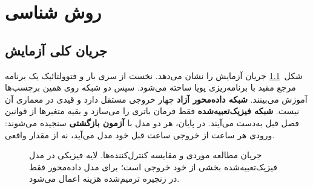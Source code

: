 \chapter{روش شناسی}
\label{chap:method}

\section{جریان کلی آزمایش}
شکل~\ref{fig:experiment-flow} جریان آزمایش را نشان می‌دهد. نخست از سری بار و فتوولتائیک یک برنامه مرجع مقید با برنامه‌ریزی پویا ساخته می‌شود. سپس دو شبکه روی همین برچسب‌ها آموزش می‌بینند. \textbf{شبکه داده‌محور آزاد} چهار خروجی مستقل دارد و قیدی در معماری آن نیست. \textbf{شبکه فیزیک‌تعبیه‌شده} فقط فرمان باتری را می‌سازد و بقیه متغیرها از قوانین فصل قبل به‌دست می‌آیند. در پایان، هر دو مدل با \textbf{آزمون بازگشتی} سنجیده می‌شوند:  ورودی هر ساعت از خروجی ساعت قبل خود مدل می‌آید، نه از مقدار واقعی.

\begin{figure}[H]
  \centering
  \caption{جریان مطالعه موردی و مقایسه کنترل‌کننده‌ها. لایه فیزیکی در مدل فیزیک‌تعبیه‌شده بخشی از خود خروجی است؛ برای مدل داده‌محور فقط در زنجیره ترمیم‌شده هزینه اعمال می‌شود.}
  \label{fig:experiment-flow}
\end{figure}

